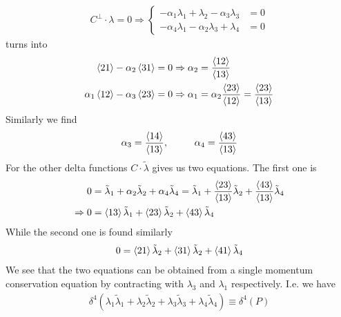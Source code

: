 \documentclass[a4paper,12pt]{article}
\begin{document}
\begin{equation}
	\begin{aligned}
		C^\perp\cdot \lambda=0\Rightarrow\begin{cases}
			-\alpha_1\lambda_1+\lambda_2-\alpha_3\lambda_3&=0\\
			-\alpha_4\lambda_1-\alpha_2\lambda_3+\lambda_4&=0
		\end{cases}
	\end{aligned}
\end{equation}
turns into
\begin{equation}
	\begin{aligned}
		\expval{21} -\alpha_2 \expval{31}&=0\Rightarrow\alpha_2=\frac{\expval{12}}{\expval{13}}\\
		\alpha_1\expval{12} -\alpha_3\expval{23}&=0 \Rightarrow\alpha_1=\alpha_2\frac{\expval{23}}{\expval{12}}=\frac{\expval{23}}{\expval{13}}
	\end{aligned}
\end{equation}
Similarly we find
\begin{equation}
	\begin{aligned}
		\alpha_3=\frac{\expval{14}}{\expval{13}},~~~~~~~~\alpha_4=\frac{\expval{43}}{\expval{13}}
	\end{aligned}
\end{equation}
For the other delta functions $C\cdot \tilde\lambda$ gives us two equations. The first one is
\begin{equation}
	\begin{aligned}
		0&=\tilde\lambda_1+\alpha_2\tilde\lambda_2+\alpha_4\tilde\lambda_4=\tilde\lambda_1+\frac{\expval{23}}{\expval{13}}\tilde\lambda_2+\frac{\expval{43}}{\expval{13}}\tilde\lambda_4\\
		\Rightarrow 0&=\expval{13}\tilde\lambda_1+\expval{23}\tilde\lambda_2+\expval{43}\tilde\lambda_4
	\end{aligned}
\end{equation}
While the second one is found similarly
\begin{equation}
	\begin{aligned}
		0=\expval{21}\tilde\lambda_2+\expval{31}\tilde\lambda_2+\expval{41}\tilde\lambda_4
	\end{aligned}
\end{equation}
We see that the two equations can be obtained from a single momentum conservation equation by contracting with $\lambda_3$ and $\lambda_1$ respectively. I.e. we have
\begin{equation}
	\begin{aligned}
		\delta^{4}(\lambda_1\tilde\lambda_1+\lambda_2\tilde\lambda_2+\lambda_3\tilde\lambda_3+\lambda_4\tilde\lambda_4)\equiv \delta^{4}\left(P\right)
	\end{aligned}
\end{equation}
\end{document}
